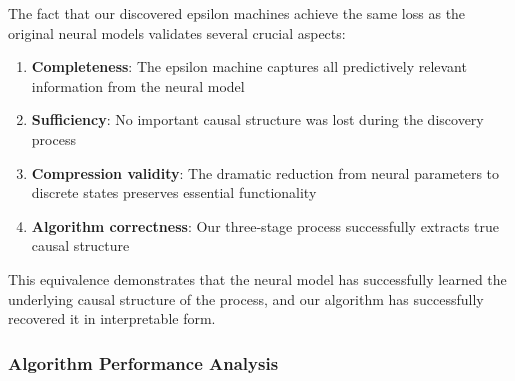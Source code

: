\documentclass[11pt]{article}
\begin{document}
\begin{notebox}
The fact that our discovered epsilon machines achieve the same loss as the original neural models validates several crucial aspects:

\begin{enumerate}
\item \textbf{Completeness}: The epsilon machine captures all predictively relevant information from the neural model
\item \textbf{Sufficiency}: No important causal structure was lost during the discovery process
\item \textbf{Compression validity}: The dramatic reduction from neural parameters to discrete states preserves essential functionality
\item \textbf{Algorithm correctness}: Our three-stage process successfully extracts true causal structure
\end{enumerate}

This equivalence demonstrates that the neural model has successfully learned the underlying causal structure of the process, and our algorithm has successfully recovered it in interpretable form.
\end{notebox}

\subsubsection{Algorithm Performance Analysis}
\end{document}
